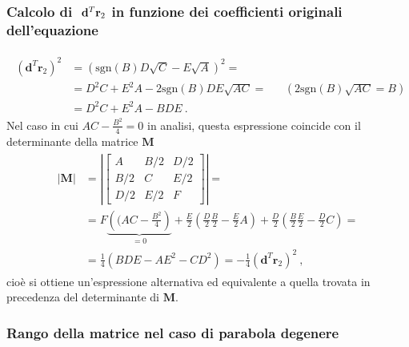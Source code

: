 \documentclass[letterpaper,10pt,italian]{jupyterBook}
\begin{document}
\subsubsection*{Calcolo di \protect\(\ \mathbf{d}^T \mathbf{r}_2\protect\) in funzione dei coefficienti originali dell’equazione}
\begin{equation*}
\begin{split}\begin{aligned}
  \left(\mathbf{d}^T \mathbf{r}_2 \right)^2
  & = \left( \text{sgn}(B) D \sqrt{C} - E \sqrt{A} \right)^2 = \\
  & = D^2 C + E^2 A - 2 \text{sgn}(B) DE \sqrt{AC} = && ( 2 \text{sgn}(B) \sqrt{AC} = B ) \\
  & = D^2 C + E^2 A - B D E \ .
\end{aligned}\end{split}
\end{equation*}
\sphinxAtStartPar
Nel caso in cui \(AC - \frac{B^2}{4} = 0\) in analisi, questa espressione coincide con il determinante della matrice \(\mathbf{M}\)
\begin{equation*}
\begin{split}\begin{aligned}
  |\mathbf{M}|
  & = \left| \begin{bmatrix} A & B/2 & D/2 \\ B/2 & C & E/2 \\ D/2 & E/2 & F \end{bmatrix} \right| = \\
  & = F \underbrace{\left(( AC - \frac{B^2}{4} \right)}_{=0} + \frac{E}{2} \left( \frac{D}{2} \frac{B}{2} - \frac{E}{2} A \right) + \frac{D}{2} \left( \frac{B}{2} \frac{E}{2} - \frac{D}{2} C \right) = \\
  & = \frac{1}{4} \left( BDE - AE^2 - CD^2 \right) = - \frac{1}{4} \left( \mathbf{d}^T \mathbf{r}_2 \right)^2 \ ,
\end{aligned}\end{split}
\end{equation*}
\sphinxAtStartPar
cioè si ottiene un’espressione alternativa ed equivalente a quella trovata in precedenza del determinante di \(\mathbf{M}\).


\subsubsection*{Rango della matrice nel caso di parabola degenere}
\end{document}
